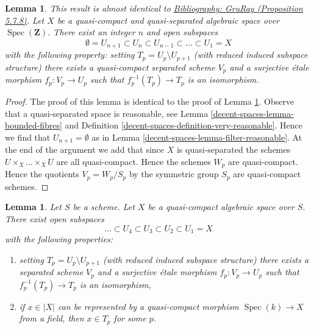 \documentclass{amsart}
\newenvironment{reference}{\comment}{\endcomment}
\theoremstyle{plain}
\newtheorem{lemma}[subsection]{Lemma}
\theoremstyle{definition}
\theoremstyle{remark}
\numberwithin{equation}{subsection}
\def\Spec{\mathop{\mathrm{Spec}}}
\begin{document}
\begin{lemma}
\label{decent-spaces-lemma-filter-quasi-compact-quasi-separated}
\begin{reference}
This result is almost identical to \href{https://stacks.math.columbia.edu/bibliography}{Bibliography: GruRay (Proposition 5.7.8)}.
\end{reference}
Let $X$ be a quasi-compact and quasi-separated algebraic space over
$\Spec(\mathbf{Z})$. There exist an integer $n$ and open subspaces
$$
\emptyset = U_{n + 1} \subset
U_n \subset U_{n - 1} \subset \ldots \subset U_1 = X
$$
with the following property: setting $T_p = U_p \setminus U_{p + 1}$
(with reduced induced subspace structure) there exists a quasi-compact
separated scheme $V_p$ and a surjective \'etale morphism $f_p : V_p \to U_p$
such that $f_p^{-1}(T_p) \to T_p$ is an isomorphism.
\end{lemma}

\begin{proof}
The proof of this lemma is identical to the proof of
Lemma \ref{decent-spaces-lemma-filter-quasi-compact}.
Observe that a quasi-separated space is reasonable, see
Lemma \ref{decent-spaces-lemma-bounded-fibres} and
Definition \ref{decent-spaces-definition-very-reasonable}.
Hence we find that $U_{n + 1} = \emptyset$ as in
Lemma \ref{decent-spaces-lemma-filter-reasonable}.
At the end of the argument we add that since $X$ is quasi-separated
the schemes $U \times_X \ldots \times_X U$ are all quasi-compact.
Hence the schemes $W_p$ are quasi-compact. Hence the
quotients $V_p = W_p/S_p$ by the symmetric group $S_p$ are quasi-compact
schemes.
\end{proof}


\begin{lemma}
\label{decent-spaces-lemma-filter-quasi-compact}
Let $S$ be a scheme. Let $X$ be a quasi-compact algebraic space
over $S$. There exist open subspaces
$$
\ldots \subset U_4 \subset U_3 \subset U_2 \subset U_1 = X
$$
with the following properties:
\begin{enumerate}
\item setting $T_p = U_p \setminus U_{p + 1}$ (with reduced induced subspace
structure) there exists a separated scheme $V_p$ and a surjective \'etale
morphism $f_p : V_p \to U_p$ such that $f_p^{-1}(T_p) \to T_p$ is an
isomorphism,
\item if $x \in |X|$ can be represented by a quasi-compact morphism
$\Spec(k) \to X$ from a field, then $x \in T_p$ for some $p$.
\end{enumerate}
\end{lemma}
\end{document}
